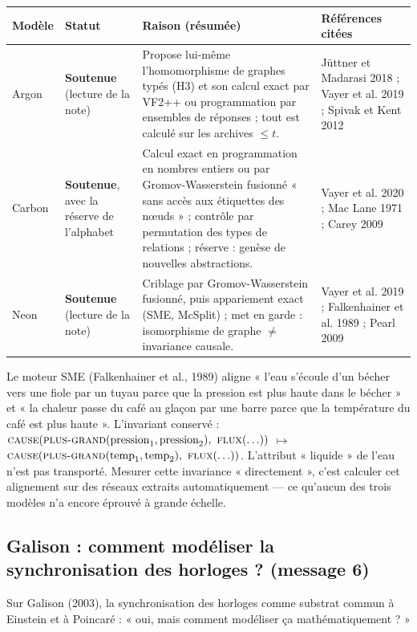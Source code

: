 \documentclass[a4paper,11pt]{article}
\makeatletter
\newenvironment{avis}{\small\renewcommand{\arraystretch}{1.15}%
\begin{longtable}{@{}>{\raggedright\arraybackslash}p{1.35cm}>{\raggedright\arraybackslash}p{2.45cm}>{\raggedright\arraybackslash}p{7.15cm}>{\raggedright\arraybackslash}p{4.4cm}@{}}
\toprule \textbf{Modèle} & \textbf{Statut} & \textbf{Raison (résumée)} & \textbf{Références citées}\\ \midrule \endhead
\bottomrule \endfoot}{\end{longtable}}
\newcommand{\st}[1]{\textbf{#1}}
\makeatother
\begin{document}
\begin{avis}
Argon & \st{Soutenue} (lecture de la note) & Propose lui-même l'homomorphisme de graphes typés (H3) et son calcul exact par VF2++ ou programmation par ensembles de réponses ; tout est calculé sur les archives $\le t$. & Jüttner et Madarasi 2018 ; Vayer et al. 2019 ; Spivak et Kent 2012\\ \midrule
Carbon & \st{Soutenue}, avec la réserve de l'alphabet & Calcul exact en programmation en nombres entiers ou par Gromov-Wasserstein fusionné « sans accès aux étiquettes des nœuds » ; contrôle par permutation des types de relations ; réserve : genèse de nouvelles abstractions. & Vayer et al. 2020 ; Mac Lane 1971 ; Carey 2009\\ \midrule
Neon & \st{Soutenue} (lecture de la note) & Criblage par Gromov-Wasserstein fusionné, puis appariement exact (SME, McSplit) ; met en garde : isomorphisme de graphe $\neq$ invariance causale. & Vayer et al. 2019 ; Falkenhainer et al. 1989 ; Pearl 2009\\
\end{avis}

\begin{exemple}
Le moteur SME (Falkenhainer et al., 1989) aligne « l'eau s'écoule d'un bécher vers une fiole par un tuyau parce que la pression est plus haute dans le bécher » et « la chaleur passe du café au glaçon par une barre parce que la température du café est plus haute ». L'invariant conservé : $\textsc{cause}(\textsc{plus-grand}(\text{pression}_1,\text{pression}_2),\ \textsc{flux}(\ldots))$ $\mapsto$ $\textsc{cause}(\textsc{plus-grand}(\text{temp}_1,\text{temp}_2),\ \textsc{flux}(\ldots))$. L'attribut « liquide » de l'eau n'est pas transporté. Mesurer cette invariance « directement », c'est calculer cet alignement sur des réseaux extraits automatiquement — ce qu'aucun des trois modèles n'a encore éprouvé à grande échelle.
\end{exemple}

\subsection{Galison : comment modéliser la synchronisation des horloges ? (message 6)}\label{sec:galison}
\begin{enonce}
Sur Galison (2003), la synchronisation des horloges comme substrat commun à Einstein et à Poincaré : « oui, mais comment modéliser ça mathématiquement ? »
\end{enonce}
\end{document}
